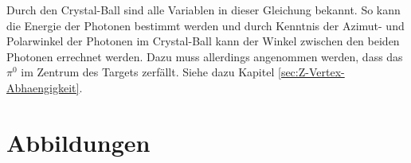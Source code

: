 \documentclass[a4paper,11pt,oneside,final,german,openbib,pdftex]{scrbook}
\begin{document}
{\begin{appendix}
Durch den Crystal-Ball sind alle Variablen in dieser Gleichung bekannt. So kann die Energie der Photonen bestimmt werden und durch Kenntnis der Azimut- und Polarwinkel der Photonen im Crystal-Ball kann der Winkel zwischen den beiden Photonen errechnet werden. Dazu muss allerdings angenommen werden, dass das $\pi^0$ im Zentrum des Targets zerfällt. Siehe dazu Kapitel \ref{sec:Z-Vertex-Abhaengigkeit}.

\section{Abbildungen}

\end{appendix}}
\end{document}
